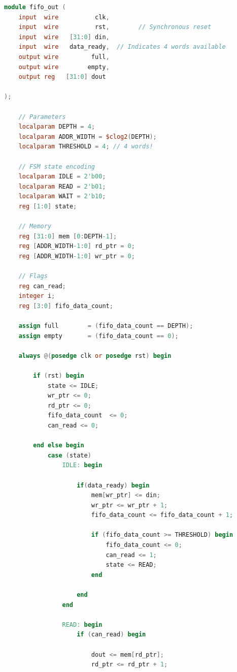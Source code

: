 \begin{lstlisting}[language=verilog,frame=single,caption={Código fuente de la cola FIFO de salida de datos},showstringspaces=false,label=lst:legacyFifoOut]
module fifo_out (
    input  wire          clk,
    input  wire          rst,        // Synchronous reset
    input  wire   [31:0] din,
    input  wire   data_ready,  // Indicates 4 words available
    output wire         full,
    output wire        empty,
    output reg   [31:0] dout
    
);

    // Parameters
    localparam DEPTH = 4;
    localparam ADDR_WIDTH = $clog2(DEPTH);
    localparam THRESHOLD = 4; // 4 words!
    
    // FSM state encoding
    localparam IDLE = 2'b00;
    localparam READ = 2'b01;
    localparam WAIT = 2'b10;
    reg [1:0] state;

    // Memory
    reg [31:0] mem [0:DEPTH-1];
    reg [ADDR_WIDTH-1:0] rd_ptr = 0;
    reg [ADDR_WIDTH-1:0] wr_ptr = 0;

    // Flags
    reg can_read;
    integer i;
    reg [3:0] fifo_data_count;
    
    assign full        = (fifo_data_count == DEPTH);
    assign empty       = (fifo_data_count == 0);

    always @(posedge clk or posedge rst) begin
        
        if (rst) begin
            state <= IDLE;
            wr_ptr <= 0;
            rd_ptr <= 0;
            fifo_data_count  <= 0;
            can_read <= 0;
            
        end else begin
            case (state)
                IDLE: begin
                    
                    if(data_ready) begin
                        mem[wr_ptr] <= din;
                        wr_ptr <= wr_ptr + 1;
                        fifo_data_count <= fifo_data_count + 1;
                    
                        if (fifo_data_count >= THRESHOLD) begin 
                            fifo_data_count <= 0;
                            can_read <= 1;
                            state <= READ;
                        end
                        
                    end 
                end
                
                READ: begin
                    if (can_read) begin
                        
                        dout <= mem[rd_ptr];
                        rd_ptr <= rd_ptr + 1;
                        

\end{lstlisting}
